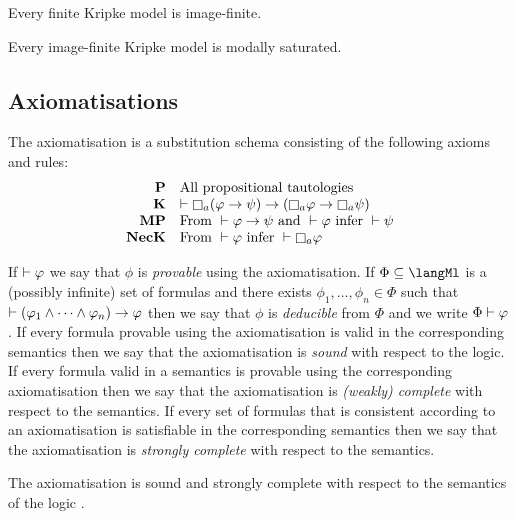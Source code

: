 \begin{proposition}
Every finite Kripke model is image-finite.
\end{proposition}

\begin{proposition}
Every image-finite Kripke model is modally saturated.
\end{proposition}

\subsection{Axiomatisations}

\begin{definition}
The axiomatisation \axiomK{} is a substitution schema consisting of the following axioms and rules:
$$
\begin{array}{rl}
    {\bf P}     & \text{All propositional tautologies}\\
    {\bf K}     & \proves \necessary[\agentA] (\phi \implies \psi) \implies (\necessary[\agentA] \phi \implies \necessary[\agentA] \psi)\\
    {\bf MP}    & \text{From } \proves \phi \implies \psi \text{ and } \proves \phi \text{ infer } \proves \psi\\
    {\bf NecK}  & \text{From } \proves \phi \text{ infer } \proves \necessary[\agentA] \phi
\end{array}
$$
\end{definition}

If $\vdash \varphi$ we say that $\phi$ is {\em provable} using the axiomatisation.
If $\Phi \subseteq \langMl$ is a (possibly infinite) set of formulas and there exists $\phi_1, \dots, \phi_n \in \Phi$ such that $\vdash (\varphi_1 \land \cdots \land \varphi_n) \rightarrow \varphi$ then we say that $\phi$ is {\em deducible} from $\Phi$ and we write $\Phi \vdash \varphi$.
If every formula provable using the axiomatisation is valid in the corresponding semantics then we say that the axiomatisation is {\em sound} with respect to the logic.
If every formula valid in a semantics is provable using the corresponding axiomatisation then we say that the axiomatisation is {\em (weakly) complete} with respect to the semantics.
If every set of formulas that is consistent according to an axiomatisation is satisfiable in the corresponding semantics then we say that the axiomatisation is {\em strongly complete} with respect to the semantics.

\begin{proposition}
The axiomatisation \axiomK{} is sound and strongly complete with respect to the semantics of the logic \logicK{}.
\end{proposition}

